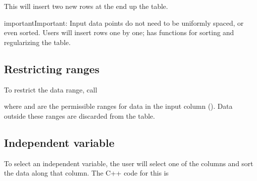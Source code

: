 \documentclass[letterpaper,10pt,english]{sphinxmanual}
\begin{document}
\begin{sphinxVerbatim}[commandchars=\\\{\},formatcom=\scriptsize]
 

  
  
\end{sphinxVerbatim}

\sphinxAtStartPar
This will insert two new rows at the end up the table.

\begin{sphinxadmonition}{important}{Important:}
\sphinxAtStartPar
Input data points do not need to be uniformly spaced, or even sorted.
Users will insert rows one by one;  has functions for sorting and regularizing the table.
\end{sphinxadmonition}


\subsection{Restricting ranges}
\label{\detokenize{Utilities/LookupTable:restricting-ranges}}
\sphinxAtStartPar
To restrict the data range, call

\begin{sphinxVerbatim}[commandchars=\\\{\},formatcom=\scriptsize]
         
\end{sphinxVerbatim}

\sphinxAtStartPar
where  and  are the permissible ranges for data in the input column ().
Data outside these ranges are discarded from the table.


\subsection{Independent variable}
\label{\detokenize{Utilities/LookupTable:independent-variable}}
\sphinxAtStartPar
To select an independent variable, the user will select one of the columns and sort the data along that column.
The C++ code for this is
\end{document}
